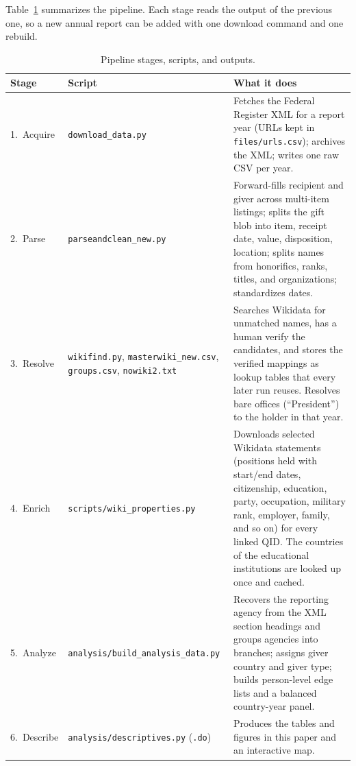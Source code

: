 \documentclass[11pt]{article}
\makeatletter
\renewcommand\section{\@startsection{section}{1}{\z@}{-3.0ex plus -1ex minus -.2ex}{1.5ex plus .2ex}{\normalfont\large\bfseries\MakeUppercase}}
\makeatother
\begin{document}
\section{The Pipeline}\label{sec:pipeline}

Table~\ref{tab:pipeline} summarizes the pipeline. Each stage reads the output of the previous one, so a new annual report can be added with one download command and one rebuild.

\begin{table}[t]
\centering\small
\caption{Pipeline stages, scripts, and outputs.}\label{tab:pipeline}
\begin{tabular}{p{2.6cm}p{4.2cm}p{7.6cm}}
\toprule
Stage & Script & What it does \\
\midrule
1.\ Acquire & \texttt{download\_data.py} & Fetches the Federal Register XML for a report year (URLs kept in \texttt{files/urls.csv}); archives the XML; writes one raw CSV per year. \\
2.\ Parse & \texttt{parseandclean\_new.py} & Forward-fills recipient and giver across multi-item listings; splits the gift blob into item, receipt date, value, disposition, location; splits names from honorifics, ranks, titles, and organizations; standardizes dates. \\
3.\ Resolve & \texttt{wikifind.py}, \texttt{masterwiki\_new.csv}, \texttt{groups.csv}, \texttt{nowiki2.txt} & Searches Wikidata for unmatched names, has a human verify the candidates, and stores the verified mappings as lookup tables that every later run reuses. Resolves bare offices (``President'') to the holder in that year. \\
4.\ Enrich & \texttt{scripts/wiki\_properties.py} & Downloads selected Wikidata statements (positions held with start/end dates, citizenship, education, party, occupation, military rank, employer, family, and so on) for every linked QID. The countries of the educational institutions are looked up once and cached. \\
5.\ Analyze & \texttt{analysis/build\_analysis\_data.py} & Recovers the reporting agency from the XML section headings and groups agencies into branches; assigns giver country and giver type; builds person-level edge lists and a balanced country-year panel. \\
6.\ Describe & \texttt{analysis/descriptives.py} (\texttt{.do}) & Produces the tables and figures in this paper and an interactive map. \\
\bottomrule
\end{tabular}
\end{table}
\end{document}
